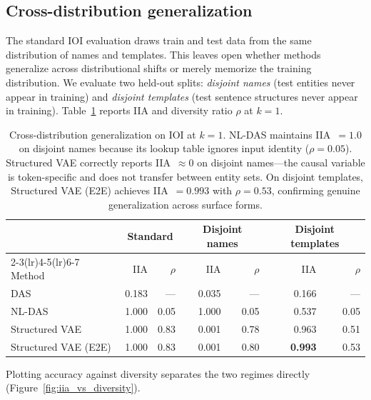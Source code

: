 \documentclass{article}
\begin{document}
\subsection{Cross-distribution generalization}
\label{sec:cross_distribution}

The standard IOI evaluation draws train and test data from the same
distribution of names and templates. This leaves open whether methods
generalize across distributional shifts or merely memorize the training
distribution. We evaluate two held-out splits: \emph{disjoint names}
(test entities never appear in training) and \emph{disjoint templates}
(test sentence structures never appear in training).
Table~\ref{tab:cross_dist} reports IIA and diversity ratio $\rho$ at $k{=}1$.

\begin{table}[t]
\centering
\small
\setlength{\tabcolsep}{3pt}
\begin{tabular}{l rr rr rr}
\toprule
& \multicolumn{2}{c}{Standard} & \multicolumn{2}{c}{Disjoint names} & \multicolumn{2}{c}{Disjoint templates} \\
\cmidrule(lr){2-3}\cmidrule(lr){4-5}\cmidrule(lr){6-7}
Method & IIA & $\rho$ & IIA & $\rho$ & IIA & $\rho$ \\
\midrule
DAS           & 0.183 & ---  & 0.035 & ---  & 0.166 & ---  \\
NL-DAS        & 1.000 & 0.05 & 1.000 & 0.05 & 0.537 & 0.05 \\
Structured VAE        & 1.000 & 0.83 & 0.001 & 0.78 & 0.963 & 0.51 \\
Structured VAE (E2E)    & 1.000 & 0.83 & 0.001 & 0.80 & \textbf{0.993} & 0.53 \\
\bottomrule
\end{tabular}
\caption{Cross-distribution generalization on IOI at $k{=}1$.
  NL-DAS maintains IIA~$= 1.0$ on disjoint names because its
  lookup table ignores input identity ($\rho = 0.05$).
  Structured VAE correctly reports IIA~$\approx 0$ on disjoint names---the
  causal variable is token-specific and does not transfer between
  entity sets.
  On disjoint templates, Structured VAE (E2E) achieves IIA~$= 0.993$ with
  $\rho = 0.53$, confirming genuine generalization across surface
  forms.}
\label{tab:cross_dist}
\end{table}

Plotting accuracy against diversity separates the two regimes directly
(Figure~\ref{fig:iia_vs_diversity}).
\end{document}
